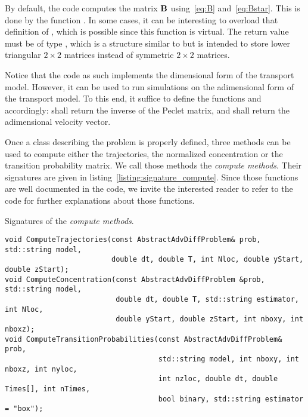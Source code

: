 By default, the code computes the matrix $\mathbf B$ using~\eqref{eq:B} and~\eqref{eq:Bstar}. This is done by the function . In some cases, it can be interesting to overload that definition of , which is possible since this function is virtual. The return value must be of type , which is a structure similar to  but is intended to store lower triangular $2\times2$ matrices instead of symmetric $2\times2$ matrices.

Notice that the code as such implements the dimensional form of the transport model. However, it can be used to run simulations on the adimensional form of the transport model. To this end, it suffice to define the functions  and  accordingly:  shall return the inverse of the Peclet matrix, and  shall return the adimensional velocity vector.

Once a class describing the problem is properly defined, three methods can be used to compute either the trajectories, the normalized concentration or the transition probability matrix. We call those methods the \textit{compute methods}. Their signatures are given in listing~\ref{listing:signature_compute}. Since those functions are well documented in the code, we invite the interested reader to refer to the code for further explanations about those functions.
\begin{listing}[ht!]
\caption{Signatures of the \textit{compute methods}.}
\label{listing:signature_compute}
\begin{verbatim}
void ComputeTrajectories(const AbstractAdvDiffProblem& prob, std::string model, 
						 double dt, double T, int Nloc, double yStart, double zStart);
void ComputeConcentration(const AbstractAdvDiffProblem &prob, std::string model,
						  double dt, double T, std::string estimator, int Nloc,
						  double yStart, double zStart, int nboxy, int nboxz);
void ComputeTransitionProbabilities(const AbstractAdvDiffProblem& prob,
									std::string model, int nboxy, int nboxz, int nyloc,
									int nzloc, double dt, double Times[], int nTimes,
									bool binary, std::string estimator = "box");
\end{verbatim}
\end{listing}

